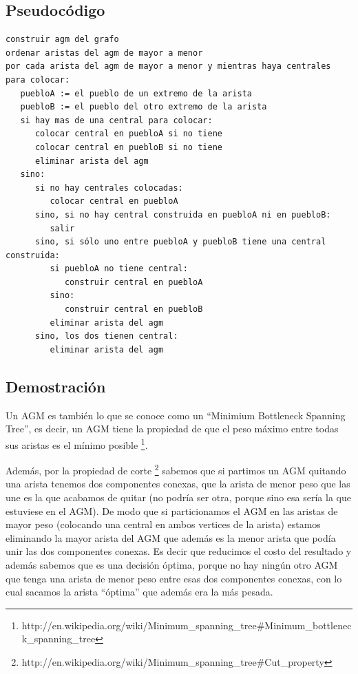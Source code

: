 \subsection{Pseudoc\'odigo}
\begin{verbatim}
construir agm del grafo
ordenar aristas del agm de mayor a menor
por cada arista del agm de mayor a menor y mientras haya centrales para colocar:
   puebloA := el pueblo de un extremo de la arista
   puebloB := el pueblo del otro extremo de la arista
   si hay mas de una central para colocar:
      colocar central en puebloA si no tiene
      colocar central en puebloB si no tiene
      eliminar arista del agm
   sino:
      si no hay centrales colocadas:
         colocar central en puebloA
      sino, si no hay central construida en puebloA ni en puebloB:
         salir
      sino, si sólo uno entre puebloA y puebloB tiene una central construida:
         si puebloA no tiene central:
            construir central en puebloA
         sino:
            construir central en puebloB
         eliminar arista del agm
      sino, los dos tienen central:
         eliminar arista del agm
\end{verbatim}

\subsection{Demostraci\'on}
Un AGM es también lo que se conoce como un ``Minimium Bottleneck Spanning Tree'', es decir, un AGM tiene la propiedad de que el peso máximo entre todas sus aristas
es el mínimo posible \footnote{http://en.wikipedia.org/wiki/Minimum\_spanning\_tree\#Minimum\_bottleneck\_spanning\_tree}.

Además, por la propiedad de corte \footnote{http://en.wikipedia.org/wiki/Minimum\_spanning\_tree\#Cut\_property} sabemos que si partimos un AGM quitando una arista
tenemos dos componentes conexas, que la arista de menor peso que las une es la que acabamos de quitar (no podría ser otra, porque sino esa sería la que estuviese
en el AGM). De modo que si particionamos el AGM en las aristas de mayor peso (colocando una central en ambos vertices de la arista) estamos eliminando la mayor arista
del AGM que además es la menor arista que podía unir las dos componentes conexas. Es decir que reducimos el costo del resultado y además sabemos que es una decisión óptima, porque no hay ningún otro AGM que tenga una arista de menor peso entre esas dos componentes conexas, con lo cual sacamos la arista ``óptima'' que además era la más pesada.


